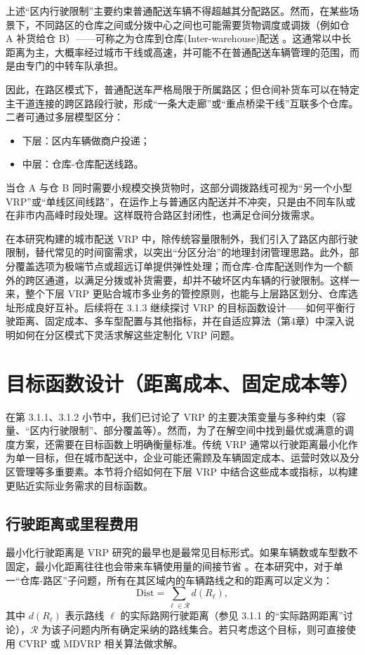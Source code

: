 \documentclass[12pt,a4paper,twoside]{ctexbook}
\begin{document}
上述“区内行驶限制”主要约束普通配送车辆不得超越其分配路区。然而，在某些场景下，不同路区的仓库之间或分拨中心之间也可能需要货物调度或调拨（例如仓 A 补货给仓 B）——可称之为仓库到仓库(Inter-warehouse)配送 \cite{cordeau1997tabu}。这通常以中长距离为主，大概率经过城市干线或高速，并可能不在普通配送车辆管理的范围，而是由专门的中转车队承担。

因此，在路区模式下，普通配送车严格局限于所属路区；但仓间补货车可以在特定主干道连接的跨区路段行驶，形成“一条大走廊”或“重点桥梁干线”互联多个仓库。二者可通过多层模型区分：
\begin{itemize}
    \item 下层：区内车辆做商户投递；
    \item 中层：仓库-仓库配送线路。
\end{itemize}

当仓 A 与仓 B 同时需要小规模交换货物时，这部分调拨路线可视为“另一个小型 VRP”或“单线区间线路”，在运作上与普通区内配送并不冲突，只是由不同车队或在非市内高峰时段处理。这样既符合路区封闭性，也满足仓间分拨需求。

在本研究构建的城市配送 VRP 中，除传统容量限制外，我们引入了路区内部行驶限制，替代常见的时间窗需求，以突出“分区分治”的地理封闭管理思路。此外，部分覆盖选项为极端节点或超远订单提供弹性处理；而仓库-仓库配送则作为一个额外的跨区通道，以满足分拨或补货需要，却并不破坏区内车辆的行驶限制。这样一来，整个下层 VRP 更贴合城市多业务的管控原则，也能与上层路区划分、仓库选址形成良好互补。后续将在 3.1.3 继续探讨 VRP 的目标函数设计——如何平衡行驶距离、固定成本、多车型配置与其他指标，并在自适应算法（第4章）中深入说明如何在分区模式下灵活求解这些定制化 VRP 问题。

\section{目标函数设计（距离成本、固定成本等）}

在第 3.1.1、3.1.2 小节中，我们已讨论了 VRP 的主要决策变量与多种约束（容量、“区内行驶限制”、部分覆盖等）。然而，为了在解空间中找到最优或满意的调度方案，还需要在目标函数上明确衡量标准。传统 VRP 通常以行驶距离最小化作为单一目标，但在城市配送中，企业可能还需顾及车辆固定成本、运营时效以及分区管理等多重要素。本节将介绍如何在下层 VRP 中结合这些成本或指标，以构建更贴近实际业务需求的目标函数。

\subsection{行驶距离或里程费用}
最小化行驶距离是 VRP 研究的最早也是最常见目标形式。如果车辆数或车型数不固定，最小化距离往往也会带来车辆使用量的间接节省 \cite{toth2014vehicle}。在本研究中，对于单一“仓库-路区”子问题，所有在其区域内的车辆路线之和的距离可以定义为：
\[
\text{Dist} = \sum_{\ell\in\mathcal{R}} d(R_\ell),
\]
其中 $d(R_\ell)$ 表示路线 $\ell$ 的实际路网行驶距离（参见 3.1.1 的“实际路网距离”讨论），$\mathcal{R}$ 为该子问题内所有确定采纳的路线集合。若只考虑这个目标，则可直接使用 CVRP 或 MDVRP 相关算法做求解。
\end{document}

